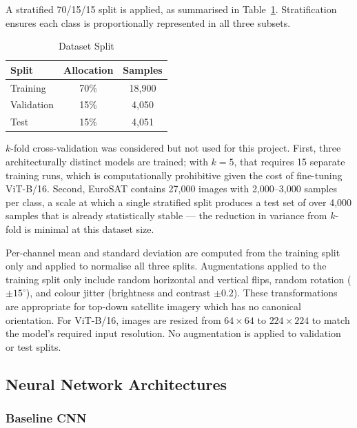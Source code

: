 \documentclass[12pt, letterpaper]{article}
\begin{document}
A stratified 70/15/15 split is applied, as summarised in Table~\ref{tab:split}.
Stratification ensures each class is proportionally represented in all three subsets.

\begin{table}[h!]
    \centering
    \caption{Dataset Split}
    \label{tab:split}
    \begin{tabular}{@{}lcc@{}}
        \toprule
        \textbf{Split} & \textbf{Allocation} & \textbf{Samples} \\
        \midrule
        Training   & 70\% & 18,900 \\
        Validation & 15\% & 4,050  \\
        Test       & 15\% & 4,051  \\
        \bottomrule
    \end{tabular}
\end{table}

$k$-fold cross-validation was considered but not used for this project. First, three
architecturally distinct models are trained; with $k = 5$, that requires 15 separate
training runs, which is computationally prohibitive given the cost of fine-tuning
ViT-B/16. Second, EuroSAT contains 27,000 images with 2,000--3,000 samples per class,
a scale at which a single stratified split produces a test set of over 4,000 samples
that is already statistically stable --- the reduction in variance from $k$-fold is
minimal at this dataset size.

Per-channel mean and standard deviation are computed from the training split only and
applied to normalise all three splits. Augmentations applied to the training split only
include random horizontal and vertical flips, random rotation ($\pm 15^\circ$), and
colour jitter (brightness and contrast $\pm 0.2$). These transformations are appropriate
for top-down satellite imagery which has no canonical orientation. For ViT-B/16, images
are resized from $64 \times 64$ to $224 \times 224$ to match the model's required
input resolution. No augmentation is applied to validation or test splits.

\subsection{Neural Network Architectures}

\subsubsection{Baseline CNN}
\end{document}

